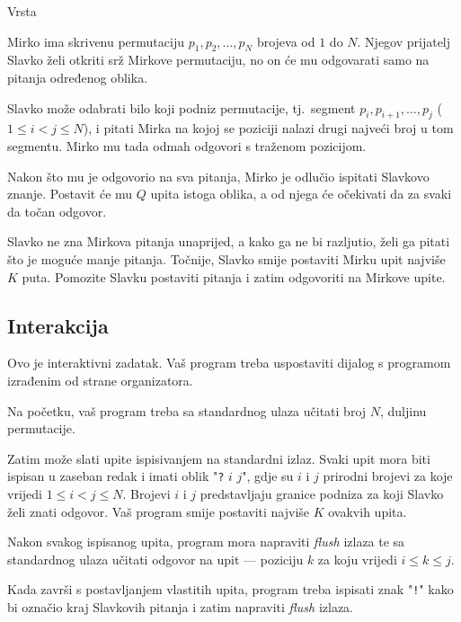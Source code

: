 \begin{statement}[
  problempoints=100,
  timelimit=1 sekunda,
  memorylimit=512 MiB,
]{Vrsta}\

Mirko ima skrivenu permutaciju $p_1, p_2, \ldots, p_N$ brojeva od $1$ do $N$. Njegov prijatelj Slavko želi otkriti srž Mirkove permutaciju, no on će mu odgovarati samo na pitanja određenog oblika.

Slavko može odabrati bilo koji podniz permutacije, tj.\ segment $p_i, p_{i+1}, \ldots, p_j$ ($1 \le i < j \le N$), i pitati Mirka na kojoj se poziciji nalazi drugi najveći broj u tom segmentu. Mirko mu tada odmah odgovori s traženom pozicijom.

Nakon što mu je odgovorio na sva pitanja, Mirko je odlučio ispitati Slavkovo znanje. Postavit će mu $Q$ upita istoga oblika, a od njega će očekivati da za svaki da točan odgovor.

Slavko ne zna Mirkova pitanja unaprijed, a kako ga ne bi razljutio, želi ga pitati što je moguće manje pitanja. Točnije, Slavko smije postaviti Mirku upit najviše $K$ puta. Pomozite Slavku postaviti pitanja i zatim odgovoriti na Mirkove upite.

\subsection*{Interakcija}

Ovo je interaktivni zadatak. Vaš program treba uspostaviti dijalog s programom izrađenim od strane organizatora.

Na početku, vaš program treba sa standardnog ulaza učitati broj $N$, duljinu permutacije.

Zatim može slati upite ispisivanjem na standardni izlaz. Svaki upit mora biti ispisan u zaseban redak i imati oblik "\texttt{?} $i$ $j$", gdje su $i$ i $j$ prirodni brojevi za koje vrijedi $1 \le i < j \le N$. Brojevi $i$ i $j$ predstavljaju granice podniza za koji Slavko želi znati odgovor. Vaš program smije postaviti najviše $K$ ovakvih upita.

Nakon svakog ispisanog upita, program mora napraviti \textit{flush} izlaza te sa standardnog ulaza učitati odgovor na upit — poziciju $k$ za koju vrijedi $i \le k \le j$.

Kada završi s postavljanjem vlastitih upita, program treba ispisati znak "\texttt{!}" kako bi označio kraj Slavkovih pitanja i zatim napraviti \textit{flush} izlaza.


\end{statement}
